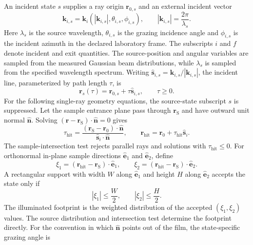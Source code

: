 An incident state $s$ supplies a ray origin $\mathbf r_{0,s}$ and an external incident vector
\begin{equation}
  \mathbf k_{i,s}=\mathbf k_i\!\left(|\mathbf k_{i,s}|,\theta_{i,s},\phi_{i,s}\right),
  \qquad |\mathbf k_{i,s}|=\frac{2\pi}{\lambda_s}.
  \label{eq:si_source_state_vector}
\end{equation}
Here $\lambda_s$ is the source wavelength, $\theta_{i,s}$ is the grazing incidence angle and $\phi_{i,s}$ is the incident azimuth in the declared laboratory frame. The subscripts $i$ and $f$ denote incident and exit quantities. The source-position and angular variables are sampled from the measured Gaussian beam distributions, while $\lambda_s$ is sampled from the specified wavelength spectrum. Writing $\hat{\mathbf s}_{i,s}=\mathbf k_{i,s}/|\mathbf k_{i,s}|$, the incident line, parameterized by path length $\tau$, is
\begin{equation}
\mathbf r_s(\tau)=\mathbf r_{0,s}+\tau\hat{\mathbf s}_{i,s},
\qquad \tau\geq0.
\label{eq:si_incident_ray}
\end{equation}
For the following single-ray geometry equations, the source-state subscript $s$ is suppressed.
Let the sample entrance plane pass through $\mathbf r_{\mathrm S}$ and have outward unit normal $\hat{\mathbf n}$. Solving $(\mathbf r-\mathbf r_{\mathrm S})\cdot\hat{\mathbf n}=0$ gives
\begin{equation}
\tau_{\mathrm{hit}}
=\frac{(\mathbf r_{\mathrm S}-\mathbf r_0)\cdot\hat{\mathbf n}}
       {\hat{\mathbf s}_i\cdot\hat{\mathbf n}},
\qquad
\mathbf r_{\mathrm{hit}}
=\mathbf r_0+\tau_{\mathrm{hit}}\hat{\mathbf s}_i.
\label{eq:si_sample_plane_intersection}
\end{equation}
The sample-intersection test rejects parallel rays and solutions with $\tau_{\mathrm{hit}}\leq0$. For orthonormal in-plane sample directions $\hat{\mathbf e}_1$ and $\hat{\mathbf e}_2$, define
\begin{equation}
\xi_1=(\mathbf r_{\mathrm{hit}}-\mathbf r_{\mathrm S})\cdot\hat{\mathbf e}_1,
\qquad
\xi_2=(\mathbf r_{\mathrm{hit}}-\mathbf r_{\mathrm S})\cdot\hat{\mathbf e}_2.
\label{eq:si_sample_coordinates}
\end{equation}
A rectangular support with width $W$ along $\hat{\mathbf e}_1$ and height $H$ along $\hat{\mathbf e}_2$ accepts the state only if
\begin{equation}
|\xi_1|\leq \frac{W}{2},
\qquad
|\xi_2|\leq \frac{H}{2}.
\label{eq:si_sample_bounds}
\end{equation}
The illuminated footprint is the weighted distribution of the accepted $(\xi_1,\xi_2)$ values. The source distribution and intersection test determine the footprint directly. For the convention in which $\hat{\mathbf n}$ points out of the film, the state-specific grazing angle is
